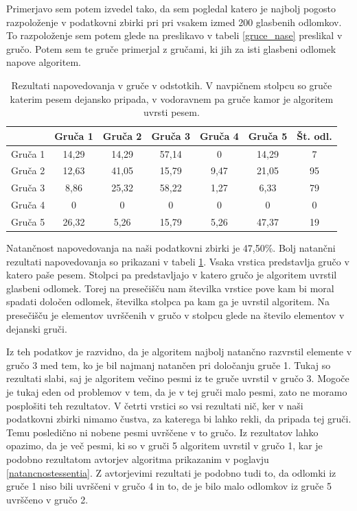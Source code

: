 \documentclass[a4paper, 12pt]{book}
\begin{document}
{Primerjavo sem potem izvedel tako, da sem pogledal katero je najbolj pogosto razpoloženje v podatkovni zbirki pri pri vsakem izmed 200 glasbenih odlomkov. To razpoloženje sem potem glede na preslikavo v tabeli \ref{gruce_nase} preslikal v gručo. Potem sem te gruče primerjal z gručami, ki jih za isti glasbeni odlomek napove algoritem. 

\begin{table}[htb]
\begin{center}
\caption{Rezultati napovedovanja v gruče v odstotkih. V navpičnem stolpcu so gruče katerim pesem dejansko pripada, v vodoravnem pa gruče kamor je algoritem uvrsti pesem.}
\begin{tabular}{|l|c|c|c|c|c|c|}
\hline
 & Gruča 1 & Gruča 2 & Gruča 3 & Gruča 4 & Gruča 5 & Št. odl.\\ \hline
Gruča 1 & 14,29 & 14,29	& 57,14 & 0 & 14,29 & 7\\ \hline
Gruča 2 & 12,63 & 41,05 & 15,79 & 9,47 & 21,05 & 95\\ \hline
Gruča 3 & 8,86 & 25,32 & 58,22 & 1,27 & 6,33 & 79\\ \hline
Gruča 4 & 0	& 0 & 0 & 0 & 0 & 0\\ \hline
Gruča 5 & 26,32	& 5,26	& 15,79 & 5,26 & 47,37 & 19 \\ \hline

\hline
\end{tabular}
\label{natancnost_gruce_nasa}
\end{center}
\end{table}

Natančnost napovedovanja na naši podatkovni zbirki je 47,50\%. Bolj natančni rezultati napovedovanja so prikazani v tabeli \ref{natancnost_gruce_nasa}. Vsaka vrstica predstavlja gručo v katero paše pesem. Stolpci pa predstavljajo v katero gručo je algoritem uvrstil glasbeni odlomek. Torej na presečišču nam številka vrstice pove kam bi moral spadati določen odlomek, številka stolpca pa kam ga je uvrstil algoritem. Na presečišču je elementov uvrščenih v gručo v stolpcu glede na število elementov v dejanski gruči. 

Iz teh podatkov je razvidno, da je algoritem najbolj natančno razvrstil elemente v gručo 3 med tem, ko je bil najmanj natančen pri določanju gruče 1. Tukaj so rezultati slabi, saj je algoritem večino pesmi iz te gruče uvrstil v gručo 3. Mogoče je tukaj eden od problemov v tem, da je v tej gruči malo pesmi, zato ne moramo posplošiti teh rezultatov. V četrti vrstici so vsi rezultati nič, ker v naši podatkovni zbirki nimamo čustva, za katerega bi lahko rekli, da pripada tej gruči. Temu posledično ni nobene pesmi uvrščene v to gručo. Iz rezultatov lahko opazimo, da je več pesmi, ki so v gruči 5 algoritem uvrstil v gručo 1, kar je podobno rezultatom avtorjev algoritma prikazanim v poglavju \ref{natancnostessentia}. Z avtorjevimi rezultati je podobno tudi to, da odlomki iz gruče 1 niso bili uvrščeni v gručo 4 in to, de je bilo malo odlomkov iz gruče 5 uvrščeno v gručo 2.

}
\end{document}
